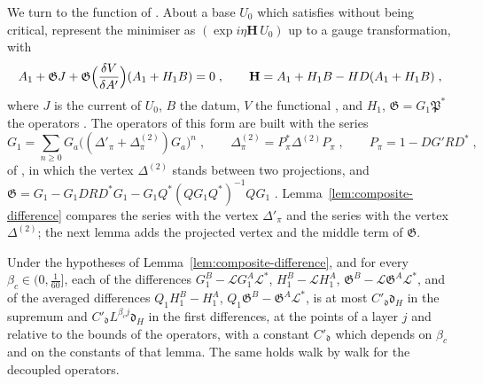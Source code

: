 We turn to the function of \cite[(1.54)]{BalabanLFR2}. About a base $U_0$ which satisfies \cite[(14)]{BalabanVAR} without being critical, \cite[Sects.~D, E]{BalabanVAR} represent the minimiser as $(\exp i\eta\mathbf H\,U_0)$ up to a gauge transformation, with
\begin{equation}\label{eq:form-111}
    A_1 + \mathfrak GJ + \mathfrak G\Bigl(\frac{\delta V}{\delta A'}\Bigr)(A_1 + H_1B) = 0\;,
    \qquad
    \mathbf H = A_1 + H_1B - HD(A_1 + H_1B)\;,
\end{equation}
where $J$ is the current of $U_0$, $B$ the datum, $V$ the functional \cite[(80)]{BalabanVAR}, and $H_1$, $\mathfrak G = G_1\mathfrak P^*$ the operators \cite[(3.129), (3.148)]{BalabanPBG} \cite[(111), (112), p.~294; Proposition~5]{BalabanVAR}. The operators of this form are built with the series
\begin{equation}\label{eq:series-g1}
    G_1 = \sum_{n \geq 0}G_a\bigl((\Delta'_\pi + \Delta^{(2)}_\pi)G_a\bigr)^n\;,
    \qquad
    \Delta^{(2)}_\pi = P_\pi^*\Delta^{(2)}P_\pi\;,
    \qquad
    P_\pi = 1 - DG'RD^*\;,
\end{equation}
of \cite[(3.135), (3.138)]{BalabanPBG}, in which the vertex $\Delta^{(2)}$ stands between two projections, and $\mathfrak G = G_1 - G_1DRD^*G_1 - G_1Q^*(QG_1Q^*)^{-1}QG_1$ \cite[(3.153), p.~426]{BalabanPBG}. Lemma~\ref{lem:composite-difference} compares the series with the vertex $\Delta'_\pi$ and the series with the vertex $\Delta^{(2)}$; the next lemma adds the projected vertex and the middle term of $\mathfrak G$.

\begin{lemma}\label{lem:polarised-operators}
Under the hypotheses of Lemma~\ref{lem:composite-difference}, and for every $\beta_c \in (0, \frac{1}{60}]$, each of the differences $G^B_1 - \mathcal LG^A_1\mathcal L^*$, $H^B_1 - \mathcal LH^A_1$, $\mathfrak G^B - \mathcal L\mathfrak G^A\mathcal L^*$, and of the averaged differences $Q_1H^B_1 - H^A_1$, $Q_1\mathfrak G^B - \mathfrak G^A\mathcal L^*$, is at most $C'_{\mathfrak d}\mathfrak d_H$ in the supremum and $C'_{\mathfrak d}L^{\beta_cj}\mathfrak d_H$ in the first differences, at the points of a layer $j$ and relative to the bounds of the operators, with a constant $C'_{\mathfrak d}$ which depends on $\beta_c$ and on the constants of that lemma. The same holds walk by walk for the decoupled operators.
\end{lemma}

